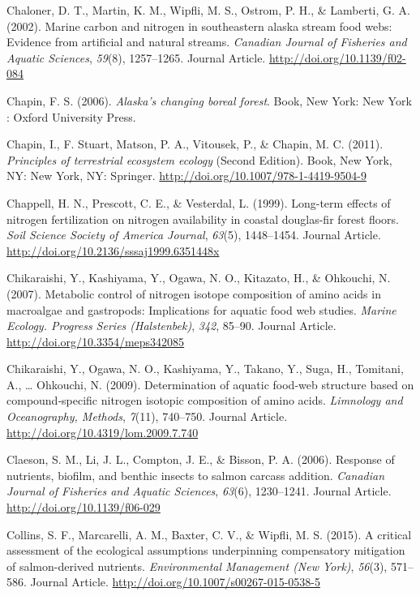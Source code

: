 \documentclass [11pt, proquest] {uwthesis}[2015/03/03]
\begin{document}
\hypertarget{ref-Chaloner2002}{}
Chaloner, D. T., Martin, K. M., Wipfli, M. S., Ostrom, P. H., \&
Lamberti, G. A. (2002). Marine carbon and nitrogen in southeastern
alaska stream food webs: Evidence from artificial and natural streams.
\emph{Canadian Journal of Fisheries and Aquatic Sciences}, \emph{59}(8),
1257--1265. Journal Article. \url{http://doi.org/10.1139/f02-084}

\hypertarget{ref-Chapin2006}{}
Chapin, F. S. (2006). \emph{Alaska's changing boreal forest}. Book, New
York: New York : Oxford University Press.

\hypertarget{ref-Chapin2011}{}
Chapin, I., F. Stuart, Matson, P. A., Vitousek, P., \& Chapin, M. C.
(2011). \emph{Principles of terrestrial ecosystem ecology} (Second
Edition). Book, New York, NY: New York, NY: Springer.
\url{http://doi.org/10.1007/978-1-4419-9504-9}

\hypertarget{ref-Chapell1999}{}
Chappell, H. N., Prescott, C. E., \& Vesterdal, L. (1999). Long-term
effects of nitrogen fertilization on nitrogen availability in coastal
douglas-fir forest floors. \emph{Soil Science Society of America
Journal}, \emph{63}(5), 1448--1454. Journal Article.
\url{http://doi.org/10.2136/sssaj1999.6351448x}

\hypertarget{ref-Chikaraishi2007}{}
Chikaraishi, Y., Kashiyama, Y., Ogawa, N. O., Kitazato, H., \& Ohkouchi,
N. (2007). Metabolic control of nitrogen isotope composition of amino
acids in macroalgae and gastropods: Implications for aquatic food web
studies. \emph{Marine Ecology. Progress Series (Halstenbek)},
\emph{342}, 85--90. Journal Article.
\url{http://doi.org/10.3354/meps342085}

\hypertarget{ref-Chikaraishi2009}{}
Chikaraishi, Y., Ogawa, N. O., Kashiyama, Y., Takano, Y., Suga, H.,
Tomitani, A., \ldots{} Ohkouchi, N. (2009). Determination of aquatic
food‐web structure based on compound‐specific nitrogen isotopic
composition of amino acids. \emph{Limnology and Oceanography, Methods},
\emph{7}(11), 740--750. Journal Article.
\url{http://doi.org/10.4319/lom.2009.7.740}

\hypertarget{ref-Claeson2006}{}
Claeson, S. M., Li, J. L., Compton, J. E., \& Bisson, P. A. (2006).
Response of nutrients, biofilm, and benthic insects to salmon carcass
addition. \emph{Canadian Journal of Fisheries and Aquatic Sciences},
\emph{63}(6), 1230--1241. Journal Article.
\url{http://doi.org/10.1139/f06-029}

\hypertarget{ref-Collins2015}{}
Collins, S. F., Marcarelli, A. M., Baxter, C. V., \& Wipfli, M. S.
(2015). A critical assessment of the ecological assumptions underpinning
compensatory mitigation of salmon-derived nutrients. \emph{Environmental
Management (New York)}, \emph{56}(3), 571--586. Journal Article.
\url{http://doi.org/10.1007/s00267-015-0538-5}
\end{document}
